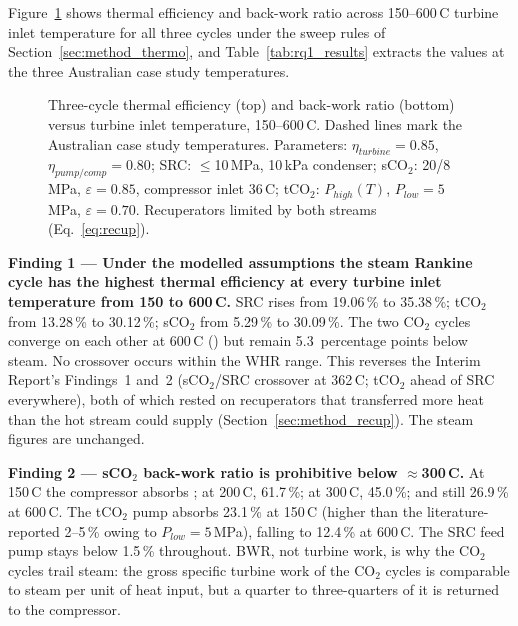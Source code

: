 Figure~\ref{fig:threecycle} shows thermal efficiency and back-work ratio
across 150--600\,\textdegree C turbine inlet temperature for all three cycles
under the sweep rules of Section~\ref{sec:method_thermo}, and
Table~\ref{tab:rq1_results} extracts the values at the three Australian case
study temperatures.

\begin{figure}[H]
\centering
{}
\caption{Three-cycle thermal efficiency (top) and back-work ratio (bottom)
versus turbine inlet temperature, 150--600\,\textdegree C. Dashed lines mark
the Australian case study temperatures. Parameters: $\eta_{turbine} = 0.85$,
$\eta_{pump/comp} = 0.80$; SRC: $\le$10\,MPa, 10\,kPa condenser; sCO$_2$:
20/8\,MPa, $\varepsilon = 0.85$, compressor inlet 36\,\textdegree C; tCO$_2$:
$P_{high}(T)$, $P_{low} = 5$\,MPa, $\varepsilon = 0.70$. Recuperators limited
by both streams (Eq.~\ref{eq:recup}).}
\label{fig:threecycle}
\end{figure}

\begin{findingbox}
\textbf{Finding 1 --- Under the modelled assumptions the steam Rankine cycle
has the highest thermal efficiency at every turbine inlet temperature from
150 to 600\,\textdegree C.}
SRC rises from 19.06\,\% to 35.38\,\%; tCO$_2$ from 13.28\,\% to 30.12\,\%;
sCO$_2$ from 5.29\,\% to 30.09\,\%. The two CO$_2$ cycles converge on each
other at 600\,\textdegree C () but remain
5.3~percentage points below steam. No crossover occurs within the WHR range.
This reverses the Interim Report's Findings~1 and~2 (sCO$_2$/SRC crossover at
362\,\textdegree C; tCO$_2$ ahead of SRC everywhere), both of which rested on
recuperators that transferred more heat than the hot stream could supply
(Section~\ref{sec:method_recup}). The steam figures are unchanged.
\end{findingbox}

\begin{findingbox}
\textbf{Finding 2 --- sCO$_2$ back-work ratio is prohibitive below
$\approx$300\,\textdegree C.}
At 150\,\textdegree C the compressor absorbs ; at 200\,\textdegree C, 61.7\,\%; at 300\,\textdegree C, 45.0\,\%;
and still 26.9\,\% at 600\,\textdegree C. The tCO$_2$ pump absorbs 23.1\,\%
at 150\,\textdegree C (higher than the literature-reported 2--5\,\% owing to
$P_{low} = 5$\,MPa), falling to 12.4\,\% at 600\,\textdegree C. The SRC feed
pump stays below 1.5\,\% throughout. BWR, not turbine work, is why the
CO$_2$ cycles trail steam: the gross specific turbine work of the CO$_2$
cycles is comparable to steam per unit of heat input, but a quarter to
three-quarters of it is returned to the compressor.
\end{findingbox}

